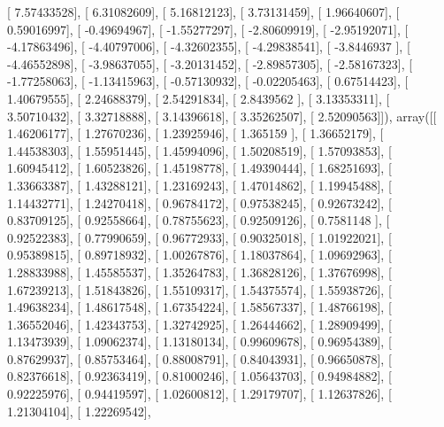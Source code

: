 \documentclass{article}
\begin{document}
       [  7.57433528],
       [  6.31082609],
       [  5.16812123],
       [  3.73131459],
       [  1.96640607],
       [  0.59016997],
       [ -0.49694967],
       [ -1.55277297],
       [ -2.80609919],
       [ -2.95192071],
       [ -4.17863496],
       [ -4.40797006],
       [ -4.32602355],
       [ -4.29838541],
       [ -3.8446937 ],
       [ -4.46552898],
       [ -3.98637055],
       [ -3.20131452],
       [ -2.89857305],
       [ -2.58167323],
       [ -1.77258063],
       [ -1.13415963],
       [ -0.57130932],
       [ -0.02205463],
       [  0.67514423],
       [  1.40679555],
       [  2.24688379],
       [  2.54291834],
       [  2.8439562 ],
       [  3.13353311],
       [  3.50710432],
       [  3.32718888],
       [  3.14396618],
       [  3.35262507],
       [  2.52090563]]), array([[ 1.46206177],
       [ 1.27670236],
       [ 1.23925946],
       [ 1.365159  ],
       [ 1.36652179],
       [ 1.44538303],
       [ 1.55951445],
       [ 1.45994096],
       [ 1.50208519],
       [ 1.57093853],
       [ 1.60945412],
       [ 1.60523826],
       [ 1.45198778],
       [ 1.49390444],
       [ 1.68251693],
       [ 1.33663387],
       [ 1.43288121],
       [ 1.23169243],
       [ 1.47014862],
       [ 1.19945488],
       [ 1.14432771],
       [ 1.24270418],
       [ 0.96784172],
       [ 0.97538245],
       [ 0.92673242],
       [ 0.83709125],
       [ 0.92558664],
       [ 0.78755623],
       [ 0.92509126],
       [ 0.7581148 ],
       [ 0.92522383],
       [ 0.77990659],
       [ 0.96772933],
       [ 0.90325018],
       [ 1.01922021],
       [ 0.95389815],
       [ 0.89718932],
       [ 1.00267876],
       [ 1.18037864],
       [ 1.09692963],
       [ 1.28833988],
       [ 1.45585537],
       [ 1.35264783],
       [ 1.36828126],
       [ 1.37676998],
       [ 1.67239213],
       [ 1.51843826],
       [ 1.55109317],
       [ 1.54375574],
       [ 1.55938726],
       [ 1.49638234],
       [ 1.48617548],
       [ 1.67354224],
       [ 1.58567337],
       [ 1.48766198],
       [ 1.36552046],
       [ 1.42343753],
       [ 1.32742925],
       [ 1.26444662],
       [ 1.28909499],
       [ 1.13473939],
       [ 1.09062374],
       [ 1.13180134],
       [ 0.99609678],
       [ 0.96954389],
       [ 0.87629937],
       [ 0.85753464],
       [ 0.88008791],
       [ 0.84043931],
       [ 0.96650878],
       [ 0.82376618],
       [ 0.92363419],
       [ 0.81000246],
       [ 1.05643703],
       [ 0.94984882],
       [ 0.92225976],
       [ 0.94419597],
       [ 1.02600812],
       [ 1.29179707],
       [ 1.12637826],
       [ 1.21304104],
       [ 1.22269542],
\end{document}
